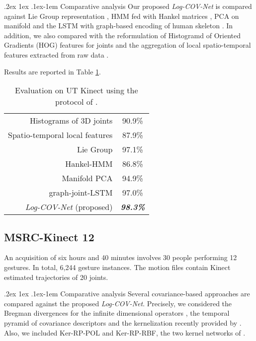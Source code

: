 \documentclass[10pt,twocolumn]{article}
\makeatletter
\renewcommand{\paragraph}{%
	\@startsection{paragraph}{4}%
	{\z@}{.2ex \@plus 1ex \@minus .1ex}{-1em}%
	{\normalfont\normalsize\bfseries}%
}
\makeatother
\begin{document}
\paragraph{Comparative analysis} Our proposed \textit{Log-COV-Net} is compared against Lie Group representation \cite{Vemulapalli:CVPR14}, HMM fed with Hankel matrices \cite{Camps:ACCV14}, PCA on manifold \cite{ela} and the LSTM with graph-based encoding of human skeleton \cite{Liu:ECCV16}. In addition, we also compared with the reformulation of Histogramd of Oriented Gradients (HOG) features for joints \cite{H3DJ} and the aggregation of local spatio-temporal features extracted from raw data \cite{randforest}.

Results are reported in Table \ref{tab:UT}.

\begin{table}[h!]
	\centering
	\begin{tabular}{|rc|}
	\hline
	Histograms of 3D joints \cite{H3DJ} & 90.9\% \\
	Spatio-temporal local features \cite{randforest} & 87.9\% \\ 
	Lie Group \cite{Vemulapalli:CVPR14} & 97.1\% \\ 
	Hankel-HMM \cite{Camps:ACCV14} & 86.8\% \\
	Manifold PCA \cite{ela} & 94.9\% \\
	graph-joint-LSTM \cite{Liu:ECCV16} & 97.0\% \\ \hline \hline
	\textit{\textit{Log-COV-Net} } (proposed) & \textit{\textbf{98.3\%}} \\ \hline
\end{tabular}\vspace{5pt}
	\caption{Evaluation on UT Kinect using the protocol of \cite{Vemulapalli:CVPR14}.}
\label{tab:UT}
\end{table}

\subsection{MSRC-Kinect 12}

An acquisition of six hours and 40 minutes involves 30 people performing 12 gestures. In total, 6,244 gesture instances. The motion files contain Kinect estimated trajectories of 20 joints. 

\paragraph{Comparative analysis} Several covariance-based approaches are compared against the proposed \textit{Log-COV-Net}. Precisely, we considered the Bregman divergences for the infinite dimensional operators \cite{Harandi:CVPR14},  the temporal pyramid of covariance descriptors \cite{egizi} and the kernelization recently provided by \cite{Cavazza:ICPR16}. Also, we included Ker-RP-POL and Ker-RP-RBF, the two kernel networks of \cite{Wang:ICCV15}.
\end{document}

